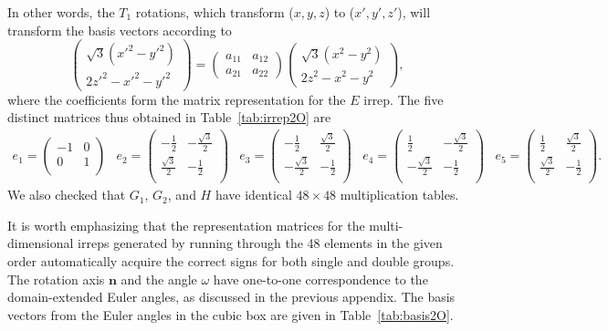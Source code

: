 \documentclass[aps,prd,reprint,showpacs,floatfix,longbibliography,,superscriptaddress]{revtex4-1}
\def\beq{\begin{equation}}
\def\eeq{\end{equation}}
\begin{document}
\begin{widetext}
In other words, the $T_1$ rotations, 
which transform ($x, y, z$) to ($x', y', z'$),  will transform the basis vectors according to 
\beq
 \left(
\begin{array}{c}
\sqrt{3}(x'^2-y'^2) \\
2z'^2-x'^2-y'^2
\end{array}   
\right)   
=
\left(
\begin{array}{cc}
a_{11}  &  a_{12} \\
a_{21}  &  a_{22} 
\end{array}   
\right)    
 \left(
\begin{array}{c}
\sqrt{3}(x^2-y^2) \\
2z^2-x^2-y^2
\end{array}   
\right),      
\eeq
where the coefficients form the matrix representation for the $E$ irrep.  
The five distinct matrices thus obtained in Table~\ref{tab:irrep2O} are 
\beq
\begin{array}{ccccc}
 e_1=\left(
\begin{array}{cc}
 -1 & 0 \\
 0 & 1 \\
\end{array}
\right) & e_2=\left(
\begin{array}{cc}
 -\frac{1}{2} & -\frac{\sqrt{3}}{2} \\
 \frac{\sqrt{3}}{2} & -\frac{1}{2} \\
\end{array}
\right) & e_3=\left(
\begin{array}{cc}
 -\frac{1}{2} & \frac{\sqrt{3}}{2} \\
 -\frac{\sqrt{3}}{2} & -\frac{1}{2} \\
\end{array}
\right) & e_4=\left(
\begin{array}{cc}
 \frac{1}{2} & -\frac{\sqrt{3}}{2} \\
 -\frac{\sqrt{3}}{2} & -\frac{1}{2} \\
\end{array}
\right) & e_5=\left(
\begin{array}{cc}
 \frac{1}{2} & \frac{\sqrt{3}}{2} \\
 \frac{\sqrt{3}}{2} & -\frac{1}{2} \\
\end{array}
\right). 
\end{array}
\eeq
%
We also checked that $G_1$, $G_2$, and $H$ have identical $48\times 48$  multiplication tables.

It is worth emphasizing that the representation matrices for the multi-dimensional irreps 
generated by running through the 48 elements in the given order automatically acquire the correct signs for 
both single and double groups. The rotation axis $\bm n$ and the angle $\omega$ have one-to-one correspondence to the domain-extended Euler angles, as discussed in the previous appendix. The basis vectors from the Euler angles 
in the cubic box are given in Table~\ref{tab:basis2O}.



\end{widetext}
\end{document}
